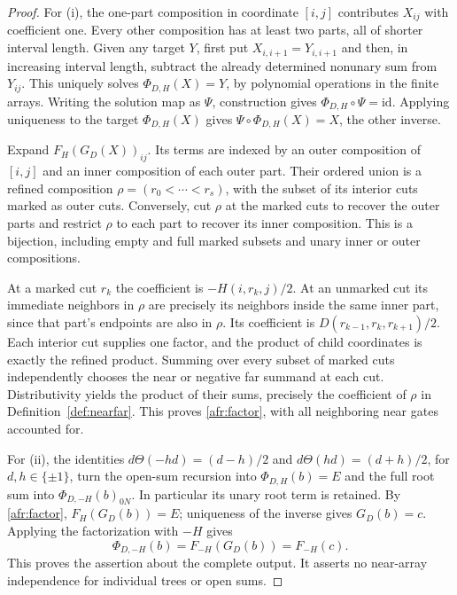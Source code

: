 \begin{proof}
For (i), the one-part composition in coordinate $[i,j]$ contributes
$X_{ij}$ with coefficient one. Every other composition has at least two
parts, all of shorter interval length. Given any target $Y$, first put
$X_{i,i+1}=Y_{i,i+1}$ and then, in increasing interval length, subtract
the already determined nonunary sum from $Y_{ij}$. This uniquely solves
$\Phi_{D,H}(X)=Y$, by polynomial operations in the finite arrays.
Writing the solution map as $\Psi$, construction gives
$\Phi_{D,H}\circ\Psi=\mathrm{id}$. Applying uniqueness to the target
$\Phi_{D,H}(X)$ gives $\Psi\circ\Phi_{D,H}(X)=X$, the other inverse.

Expand $F_H(G_D(X))_{ij}$. Its terms are indexed by an outer
composition of $[i,j]$ and an inner composition of each outer part.
Their ordered union is a refined composition
$\rho=(r_0<\cdots<r_s)$, with the subset of its interior cuts marked
as outer cuts. Conversely, cut $\rho$ at the marked cuts to recover
the outer parts and restrict $\rho$ to each part to recover its inner
composition. This is a bijection, including empty and full marked
subsets and unary inner or outer compositions.

At a marked cut $r_k$ the coefficient is $-H(i,r_k,j)/2$.
At an unmarked cut its immediate neighbors in $\rho$ are precisely
its neighbors inside the same inner part, since that part's endpoints
are also in $\rho$. Its coefficient is
$D(r_{k-1},r_k,r_{k+1})/2$. Each interior cut supplies one factor,
and the product of child coordinates is exactly the refined product.
Summing over every subset of marked cuts independently chooses the
near or negative far summand at each cut. Distributivity yields the
product of their sums, precisely the coefficient of $\rho$ in
Definition~\ref{def:nearfar}. This proves \eqref{afr:factor}, with all
neighboring near gates accounted for.

For (ii), the identities $d\Theta(-hd)=(d-h)/2$ and
$d\Theta(hd)=(d+h)/2$, for $d,h\in\{\pm1\}$, turn the open-sum
recursion into $\Phi_{D,H}(b)=E$ and the full root sum into
$\Phi_{D,-H}(b)_{0N}$. In particular its unary root term is retained.
By \eqref{afr:factor}, $F_H(G_D(b))=E$; uniqueness of the inverse
gives $G_D(b)=c$. Applying the factorization with $-H$ gives
\begin{equation}\label{afr:near-freedom}
\Phi_{D,-H}(b)=F_{-H}(G_D(b))=F_{-H}(c).
\end{equation}
This proves the assertion about the complete output. It asserts no
near-array independence for individual trees or open sums.


\end{proof}
